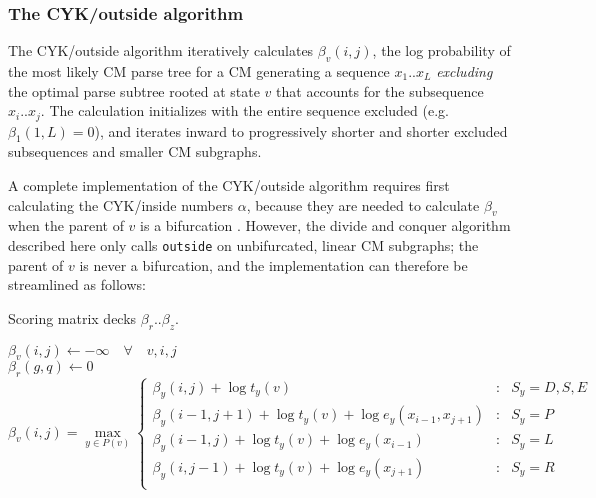 \documentclass[11pt]{article}
\begin{document}
\subsubsection{The CYK/outside algorithm}

The CYK/outside algorithm iteratively calculates $\beta_v(i,j)$, the
log probability of the most likely CM parse tree for a CM generating a
sequence $x_1..x_L$ \emph{excluding} the optimal parse subtree rooted
at state $v$ that accounts for the subsequence $x_i..x_j$. The
calculation initializes with the entire sequence excluded (e.g.
$\beta_1(1,L) = 0$), and iterates inward to progressively shorter and
shorter excluded subsequences and smaller CM subgraphs.

A complete implementation of the CYK/outside algorithm requires first
calculating the CYK/inside numbers $\alpha$, because they are needed
to calculate $\beta_v$ when the parent of $v$ is a bifurcation
\cite{Lari90,Lari91,Durbin98}. However, the divide and conquer
algorithm described here only calls \texttt{outside} on unbifurcated,
linear CM subgraphs; the parent of $v$ is never a bifurcation, and the
implementation can therefore be streamlined as follows:

\begin{algorithm}
         {Scoring matrix decks $\beta_r..\beta_z$.}
\begin{algtab*}
 $\beta_v(i,j) \leftarrow -\infty \quad \forall \quad v,i,j$\\
 $\beta_r(g,q) \leftarrow 0$\\
       $\beta_v(i,j) = \max\limits_{y \in P(v)} \left\{
              \begin{array}{rcl}
              \beta_y(i,j) + \log t_y(v) &:&  S_y = D,S,E \\
              \beta_y(i-1,j+1) + \log t_y(v) + \log e_y(x_{i-1}, x_{j+1}) &:& S_y = P\\
              \beta_y(i-1,j) + \log t_y(v) + \log e_y(x_{i-1}) &:& S_y = L\\
              \beta_y(i,j-1) + \log t_y(v) + \log e_y(x_{j+1})  &:& S_y = R \\
              \end{array} \right.$
\end{algtab*}
\end{algorithm}
\end{document}
